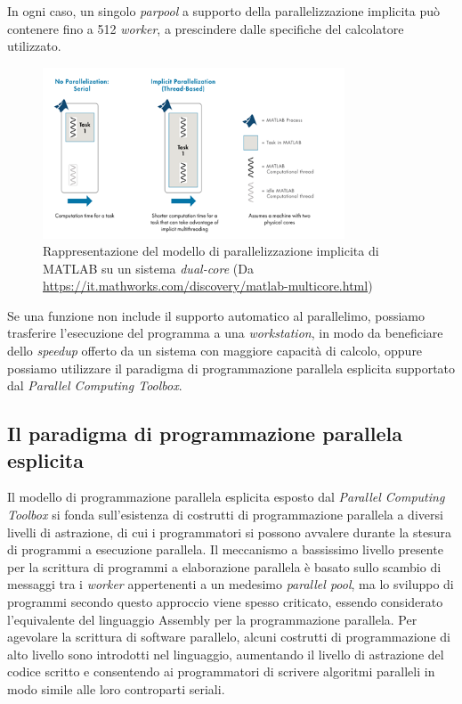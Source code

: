 In ogni caso, un singolo \textit{parpool} a supporto della parallelizzazione implicita pu\`o contenere fino a 512 \textit{worker}, a prescindere dalle specifiche 
del calcolatore utilizzato.
\begin{figure}[htbp]
    \centering
    \includegraphics[width=0.8\textwidth]{../Immagini/Capitolo 2/ImplicitParallelization.png}
    \caption{Rappresentazione del modello di parallelizzazione implicita di MATLAB su un sistema \textit{dual-core}
    \small{(Da \url{https://it.mathworks.com/discovery/matlab-multicore.html})}}
    \label{fig:ParallelismoImplicito}
\end{figure}\newline
Se una funzione non include il supporto automatico al parallelimo, possiamo trasferire l'esecuzione del programma a una \textit{workstation}, in modo da beneficiare 
dello \textit{speedup} offerto da un sistema con maggiore capacit\`a di calcolo, oppure possiamo utilizzare il paradigma di programmazione parallela esplicita 
supportato dal \textit{Parallel Computing Toolbox}.

\subsection{Il paradigma di programmazione parallela esplicita}

Il modello di programmazione parallela esplicita esposto dal \textit{Parallel Computing Toolbox} si fonda sull'esistenza di costrutti di programmazione 
parallela a diversi livelli di astrazione, di cui i programmatori si possono avvalere durante la stesura di programmi a esecuzione parallela.\newline
Il meccanismo a bassissimo livello presente per la scrittura di programmi a elaborazione parallela \`e basato sullo scambio di messaggi tra i \textit{worker} 
appertenenti a un medesimo \textit{parallel pool}, ma lo sviluppo di programmi secondo questo approccio viene spesso criticato, essendo considerato l'equivalente del linguaggio 
Assembly per la programmazione parallela.\newline
Per agevolare la scrittura di software parallelo, alcuni costrutti di programmazione di alto livello sono introdotti nel linguaggio, aumentando il livello di 
astrazione del codice scritto e consentendo ai programmatori di scrivere algoritmi paralleli in modo simile alle loro controparti seriali.


